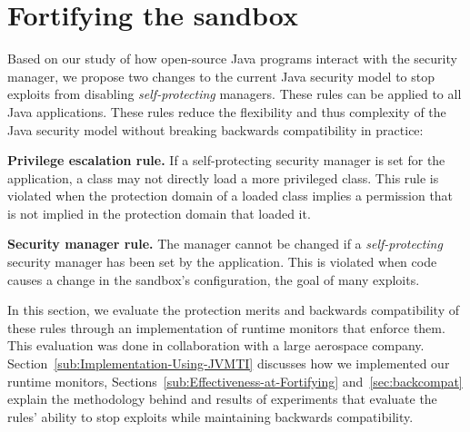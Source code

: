 \documentclass{sig-alternate}
\begin{document}
\section{Fortifying the sandbox}\label{sec:Rules-for-Fortifying}

Based on our study of how open-source Java programs interact with the security
manager, we propose two changes to the current Java security model to stop exploits
from disabling \emph{self-protecting} managers.  These rules can be applied
to all Java applications.
These rules reduce the flexibility and thus complexity of the
Java security model without breaking backwards compatibility in practice:

\noindent\textbf{Privilege escalation rule.} If a self-protecting
security manager is set for the application, a class may not directly
load a more privileged class. This rule is violated when the protection
domain of a loaded class implies a permission that is not implied
in the protection domain that loaded it. 

\noindent \textbf{Security manager rule.} The manager cannot
be changed if a \emph{self-protecting} security manager has been set
by the application. This is violated when code causes a change
in the sandbox's configuration, the goal of many exploits.



In this section, we evaluate the protection merits and backwards compatibility
of these rules through an implementation of runtime monitors that
enforce them. This evaluation was done in collaboration with a large aerospace
company.
Section~\ref{sub:Implementation-Using-JVMTI} discusses how we implemented
our runtime monitors, Sections~\ref{sub:Effectiveness-at-Fortifying}
and~\ref{sec:backcompat} explain the methodology behind and results of
experiments that evaluate the rules' ability to stop 
exploits while maintaining backwards compatibility.
\end{document}
